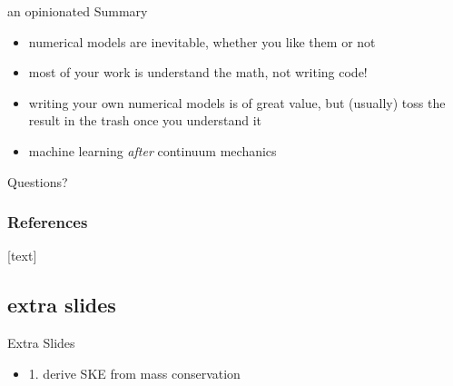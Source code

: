 \documentclass[10pt,dvipsnames]{beamer}
\begin{document}
\begin{frame}{an opinionated Summary}

\begin{itemize}
\item numerical models are inevitable, whether you like them or not
\item<2-> most of your work is understand the math, not writing code!
\item<3-> writing your own numerical models is of great value, but (usually) toss the result in the trash once you understand it
\item<4-> machine learning \emph{after} continuum mechanics
\end{itemize}
\end{frame}

\begin{frame}[standout]
  Questions?
\end{frame}


\appendix



\begin{frame}[allowframebreaks]
\frametitle{References}
[text]

  
  
\end{frame}


\subsection[]{extra slides}


\begin{frame}[standout]
Extra Slides

\begin{itemize}
\item 1. derive SKE from mass conservation
\end{itemize}
\end{frame}
\end{document}
